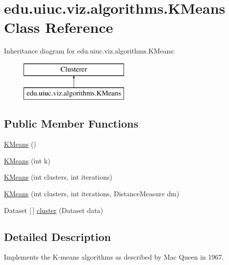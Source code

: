 \hypertarget{classedu_1_1uiuc_1_1viz_1_1algorithms_1_1_k_means}{}\section{edu.\+uiuc.\+viz.\+algorithms.\+K\+Means Class Reference}
\label{classedu_1_1uiuc_1_1viz_1_1algorithms_1_1_k_means}
Inheritance diagram for edu.\+uiuc.\+viz.\+algorithms.\+K\+Means\+:\begin{figure}[H]
\begin{center}
\leavevmode
\includegraphics[height=2.000000cm]{classedu_1_1uiuc_1_1viz_1_1algorithms_1_1_k_means}
\end{center}
\end{figure}
\subsection*{Public Member Functions}
\begin{DoxyCompactItemize}
\item 
\mbox{\hyperlink{classedu_1_1uiuc_1_1viz_1_1algorithms_1_1_k_means_a7681bf0f2521c385838b853c11d95aa9}{K\+Means}} ()
\item 
\mbox{\hyperlink{classedu_1_1uiuc_1_1viz_1_1algorithms_1_1_k_means_ab3126bebfc8ed429dd34a5e05da7e7e3}{K\+Means}} (int k)
\item 
\mbox{\hyperlink{classedu_1_1uiuc_1_1viz_1_1algorithms_1_1_k_means_aedc5f4ee20c7b193c89089a5ac0c2183}{K\+Means}} (int clusters, int iterations)
\item 
\mbox{\hyperlink{classedu_1_1uiuc_1_1viz_1_1algorithms_1_1_k_means_ade4c170f802b8593cd82f089a7905cc8}{K\+Means}} (int clusters, int iterations, Distance\+Measure dm)
\item 
Dataset \mbox{[}$\,$\mbox{]} \mbox{\hyperlink{classedu_1_1uiuc_1_1viz_1_1algorithms_1_1_k_means_a3ee0bcd01fa2cb25c64789e0cae5fb8c}{cluster}} (Dataset data)
\end{DoxyCompactItemize}


\subsection{Detailed Description}
Implements the K-\/means algorithms as described by Mac Queen in 1967.

